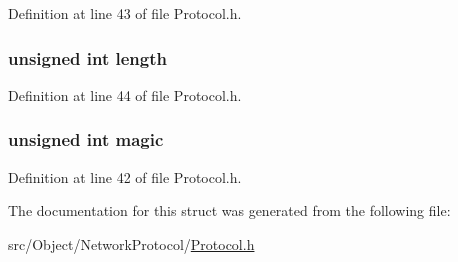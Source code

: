 Definition at line 43 of file Protocol.h.

\hypertarget{struct_cmd_header_ac8d42bcd4a44e078047ccd7291059238}{
\subsubsection[{length}]{\setlength{\rightskip}{0pt plus 5cm}unsigned int {\bf length}}}
\label{struct_cmd_header_ac8d42bcd4a44e078047ccd7291059238}


Definition at line 44 of file Protocol.h.

\hypertarget{struct_cmd_header_a7154179fe070a40c828f7c03f454d4d6}{
\subsubsection[{magic}]{\setlength{\rightskip}{0pt plus 5cm}unsigned int {\bf magic}}}
\label{struct_cmd_header_a7154179fe070a40c828f7c03f454d4d6}


Definition at line 42 of file Protocol.h.



The documentation for this struct was generated from the following file:\begin{DoxyCompactItemize}
\item 
src/Object/NetworkProtocol/\hyperlink{_protocol_8h}{Protocol.h}\end{DoxyCompactItemize}
